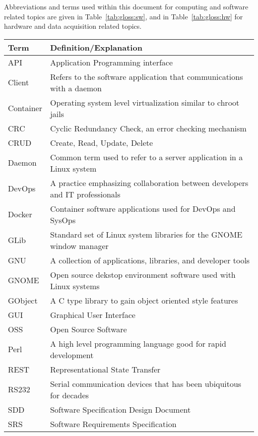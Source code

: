 \documentclass[11pt]{article}
\begin{document}
    Abbreviations and terms used within this document for computing and
    software related topics are given in Table~\ref{tab:gloss:sw}, and in
    Table~\ref{tab:gloss:hw} for hardware and data acquisition related topics.

    \begin{table}[H]
      \centering
      \begin{tabular}{l p{12cm}}
        \toprule
        Term & Definition/Explanation \\ [0.5ex]
        \midrule
        API & Application Programming interface \\
        Client & Refers to the software application that communications with a daemon \\
        Container & Operating system level virtualization similar to chroot jails \\
        CRC & Cyclic Redundancy Check, an error checking mechanism \\
        CRUD & Create, Read, Update, Delete \\
        Daemon & Common term used to refer to a server application in a Linux system \\
        DevOps & A practice emphasizing collaboration between developers and IT professionals \\
        Docker & Container software applications used for DevOps and SysOps \\
        GLib & Standard set of Linux system libraries for the GNOME window manager \\
        GNU & A collection of applications, libraries, and developer tools \\
        GNOME & Open source dekstop environment software used with Linux systems \\
        GObject & A C type library to gain object oriented style features \\
        GUI & Graphical User Interface \\
        OSS & Open Source Software \\
        Perl & A high level programming language good for rapid development \\
        REST & Representational State Transfer \\
        RS232 & Serial communication devices that has been ubiquitous for decades \\
        SDD & Software Specification Design Document \\
        SRS & Software Requirements Specification \\

\end{tabular}
\end{table}
\end{document}
